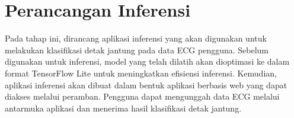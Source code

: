 

\section{Perancangan Inferensi}
\label{subsec: bab4-perancangan-inferensi}


Pada tahap ini, dirancang aplikasi inferensi yang akan digunakan untuk melakukan klasifikasi detak jantung pada data ECG pengguna.
Sebelum digunakan untuk inferensi, model yang telah dilatih akan dioptimasi ke dalam format TensorFlow Lite untuk meningkatkan efisiensi inferensi.
Kemudian, aplikasi inferensi akan dibuat dalam bentuk aplikasi berbasis web yang dapat diakses melalui peramban.
Pengguna dapat mengunggah data ECG melalui antarmuka aplikasi dan menerima hasil klasifikasi detak jantung.


